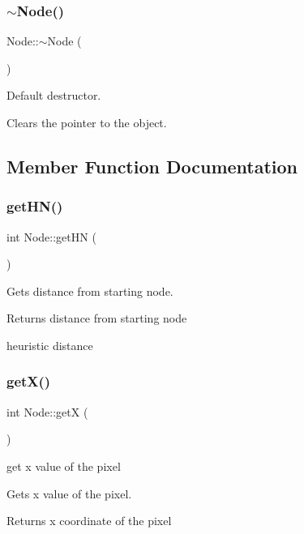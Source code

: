 \subsubsection{\texorpdfstring{$\sim$\+Node()}{~Node()}}
{\footnotesize\ttfamily Node\+::$\sim$\+Node (\begin{DoxyParamCaption}{ }\end{DoxyParamCaption})}



Default destructor. 

Clears the pointer to the object. 

\subsection{Member Function Documentation}
\mbox{\label{classNode_a1f06c65654c6eada84f33e6cc75602a2}} 
\subsubsection{\texorpdfstring{get\+H\+N()}{getHN()}}
{\footnotesize\ttfamily int Node\+::get\+HN (\begin{DoxyParamCaption}{ }\end{DoxyParamCaption})}



Gets distance from starting node. 

\begin{DoxyReturn}{Returns}
distance from starting node 

heuristic distance 
\end{DoxyReturn}
\mbox{\label{classNode_a6c026e5d8c28591c6e2bd08c68619fd1}} 
\subsubsection{\texorpdfstring{get\+X()}{getX()}}
{\footnotesize\ttfamily int Node\+::getX (\begin{DoxyParamCaption}{ }\end{DoxyParamCaption})}



get x value of the pixel 

Gets x value of the pixel.

\begin{DoxyReturn}{Returns}
x coordinate of the pixel 
\end{DoxyReturn}
\mbox{\label{classNode_abab48a3f494994d4f456897f3372d3ae}} 
